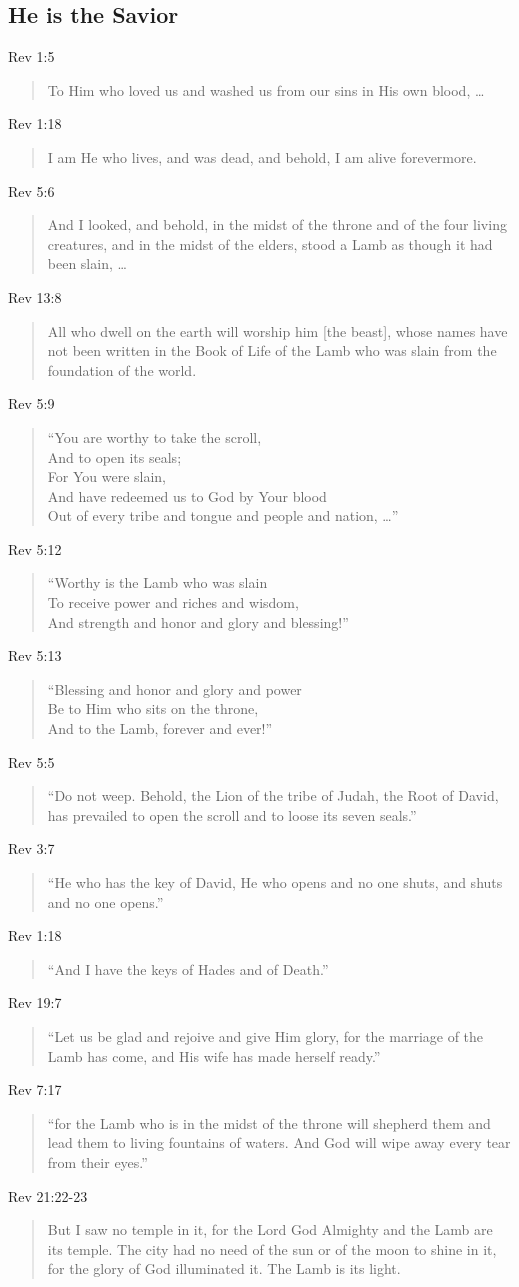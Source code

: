 \documentclass[12pt]{article}
\newcommand{\I}{\item}
\newcommand{\Q}[1]{\begin{quote} #1 \end{quote}}
\begin{document}
\subsection{He is the Savior}
\I Rev 1:5 \Q{To Him who loved us and washed us from our sins 
                in His own blood, \ldots}
\I Rev 1:18 \Q{I am He who lives, and was dead, and behold, 
                I am alive forevermore.}
\I Rev 5:6 \Q{And I looked, and behold, in the midst of the throne
                and of the four living creatures, and in the midst of the
                elders, stood a Lamb as though it had been slain, \ldots}
\I Rev 13:8 \Q{All who dwell on the earth will worship him [the beast], 
                whose names have not been written in the Book of Life
                of the Lamb who was slain from the foundation of the world.}
\I Rev 5:9 \Q{``You are worthy to take the scroll, \\
                And to open its seals; \\
                For You were slain, \\
                And have redeemed us to God by Your blood \\
                Out of every tribe and tongue and people and nation, \ldots''}
\I Rev 5:12 \Q{``Worthy is the Lamb who was slain \\
                To receive power and riches and wisdom, \\
                And strength and honor and glory and blessing!''}
\I Rev 5:13 \Q{``Blessing and honor and glory and power \\
                Be to Him who sits on the throne, \\
                And to the Lamb, forever and ever!''}
\I Rev 5:5 \Q{``Do not weep. Behold, the Lion of the tribe of Judah,
                the Root of David, has prevailed to open the scroll 
                and to loose its seven seals.''}
\I Rev 3:7 \Q{``He who has the key of David, He who opens and no one shuts, 
                and shuts and no one opens.''}
\I Rev 1:18 \Q{``And I have the keys of Hades and of Death.''}
\I Rev 19:7 \Q{``Let us be glad and rejoive and give Him glory,
                for the marriage of the Lamb has come,
                and His wife has made herself ready.''}
\I Rev 7:17 \Q{``for the Lamb who is in the midst of the throne 
                will shepherd them and lead them to living fountains of waters.
                And God will wipe away every tear from their eyes.''}
\I Rev 21:22-23 \Q{But I saw no temple in it, for the Lord God Almighty 
                and the Lamb are its temple. The city had no need 
                of the sun or of the moon to shine in it, 
                for the glory of God illuminated it. The Lamb is its light.}
\end{document}
